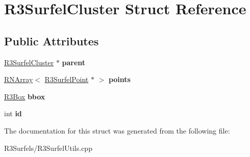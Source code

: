 \hypertarget{struct_r3_surfel_cluster}{}\section{R3\+Surfel\+Cluster Struct Reference}
\label{struct_r3_surfel_cluster}
\subsection*{Public Attributes}
\begin{DoxyCompactItemize}
\item 
\hyperlink{struct_r3_surfel_cluster}{R3\+Surfel\+Cluster} $\ast$ {\bfseries parent}\hypertarget{struct_r3_surfel_cluster_acddf2e9ec9ccaf558ea954b345d30775}{}\label{struct_r3_surfel_cluster_acddf2e9ec9ccaf558ea954b345d30775}

\item 
\hyperlink{class_r_n_array}{R\+N\+Array}$<$ \hyperlink{class_r3_surfel_point}{R3\+Surfel\+Point} $\ast$ $>$ {\bfseries points}\hypertarget{struct_r3_surfel_cluster_aeb5bef2de1fa230f77f4e29ea71c436a}{}\label{struct_r3_surfel_cluster_aeb5bef2de1fa230f77f4e29ea71c436a}

\item 
\hyperlink{class_r3_box}{R3\+Box} {\bfseries bbox}\hypertarget{struct_r3_surfel_cluster_a2e2aa01e6179adb538f5e50b40eb3703}{}\label{struct_r3_surfel_cluster_a2e2aa01e6179adb538f5e50b40eb3703}

\item 
int {\bfseries id}\hypertarget{struct_r3_surfel_cluster_a63911c3e92e74bb5768878ebd90d624f}{}\label{struct_r3_surfel_cluster_a63911c3e92e74bb5768878ebd90d624f}

\end{DoxyCompactItemize}


The documentation for this struct was generated from the following file\+:\begin{DoxyCompactItemize}
\item 
R3\+Surfels/R3\+Surfel\+Utils.\+cpp\end{DoxyCompactItemize}
